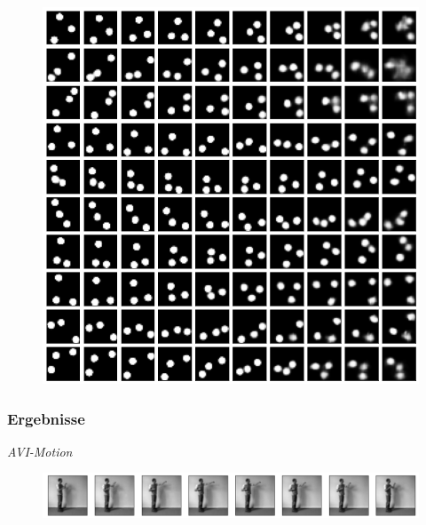 \begin{frame}
\begin{figure}[h!]
\begin{minipage}{0.33\textwidth}
		\includegraphics[scale=0.19]{Bilder/bouncingBalls_ODE}
	\end{minipage}
\end{figure}
\end{frame}




\begin{frame}
\frametitle{Ergebnisse}
\emph{AVI-Motion}
\begin{figure}[!htbp]
	\centering
	\includegraphics[scale=0.35]{Bilder/AVIMotion}
\end{figure}
\end{frame}




